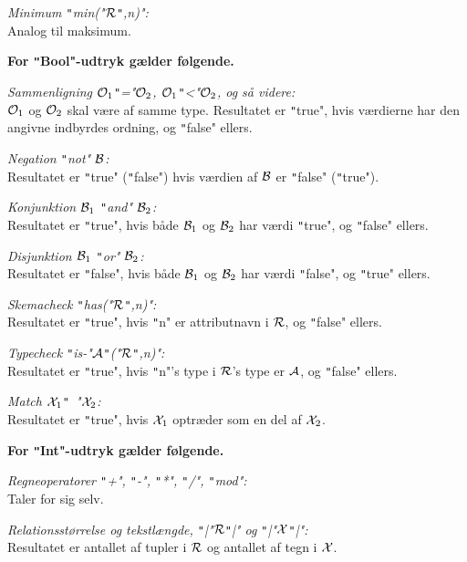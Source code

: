 \documentclass{article}
\newcounter{eks}
\begin{document}
{\em Minimum \texttt"min("$\cal R$\texttt",n)":}\\
Analog til maksimum.

{\bf For \texttt"Bool"-udtryk g\ae{}lder f\o{}lgende.}

{\em Sammenligning ${\cal O}_1$\texttt"="${\cal O}_2$, ${\cal O}_1$\texttt"<"${\cal O}_2$, og s\aa{} videre:}\\
${\cal O}_1$ og ${\cal O}_2$ skal v\ae{}re af samme type. Resultatet er
\texttt"true", hvis v\ae{}rdierne har den angivne indbyrdes ordning, og
\texttt"false" ellers.

{\em Negation \texttt"not" $\cal B$:}\\
Resultatet er \texttt"true" (\texttt"false") hvis v\ae{}rdien af 
$\cal B$ er \texttt"false" (\texttt"true").

{\em Konjunktion ${\cal B}_1$ \texttt"and" ${\cal B}_2$:}\\
Resultatet er \texttt"true", hvis b\aa{}de ${\cal B}_1$ og ${\cal B}_2$
har v\ae{}rdi \texttt"true", og \texttt"false" ellers.

{\em Disjunktion ${\cal B}_1$ \texttt"or" ${\cal B}_2$:}\\
Resultatet er \texttt"false", hvis b\aa{}de ${\cal B}_1$ og ${\cal B}_2$
har v\ae{}rdi \texttt"false", og \texttt"true" ellers.

{\em Skemacheck \texttt"has("$\cal R$\texttt",n)":}\\
Resultatet er \texttt"true", hvis \texttt"n" er attributnavn i $\cal R$,
og \texttt"false" ellers.

{\em Typecheck \texttt"is-"$\cal A$\texttt"("$\cal R$\texttt",n)":}\\
Resultatet er \texttt"true", hvis \texttt"n"'s type i $\cal R$'s type
er $\cal A$, og \texttt"false" ellers.

{\em Match ${\cal X}_1$\texttt"~"${\cal X}_2$:}\\
Resultatet er \texttt"true", hvis ${\cal X}_1$ optr\ae{}der som en del af ${\cal
X}_2$.

{\bf For \texttt"Int"-udtryk g\ae{}lder f\o{}lgende.}

{\em Regneoperatorer \texttt"+", \texttt"-", \texttt"*", \texttt"/", \texttt"mod":}\\
Taler for sig selv.

{\em Relationsst\o{}rrelse og tekstl\ae{}ngde, \texttt"|"$\cal R$\texttt"|" og
\texttt"|"$\cal X$\texttt"|":}\\
Resultatet er antallet af tupler i $\cal R$ og antallet af tegn i
$\cal X$.
\end{document}
